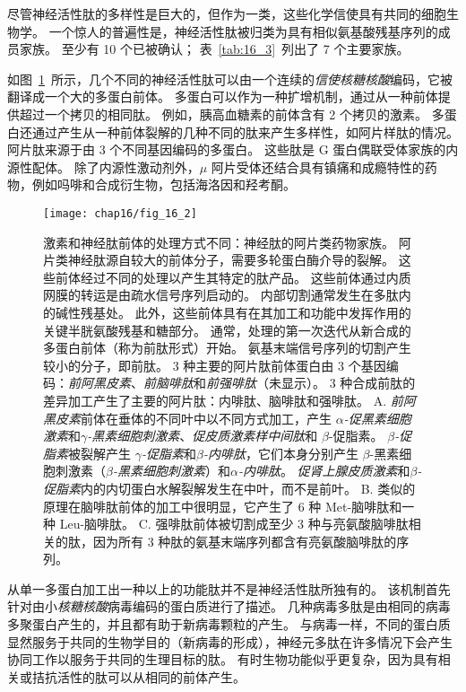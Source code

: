 尽管神经活性肽的多样性是巨大的，但作为一类，这些化学信使具有共同的细胞生物学。
一个惊人的普遍性是，神经活性肽被归类为具有相似氨基酸残基序列的成员家族。
至少有 10 个已被确认；
表~\ref{tab:16_3}~列出了 7 个主要家族。


如图~\ref{fig:16_2}~所示，几个不同的神经活性肽可以由一个连续的\textit{信使核糖核酸}编码，它被翻译成一个大的多蛋白前体。
多蛋白可以作为一种扩增机制，通过从一种前体提供超过一个拷贝的相同肽。
例如，胰高血糖素的前体含有 2 个拷贝的激素。
多蛋白还通过产生从一种前体裂解的几种不同的肽来产生多样性，如阿片样肽的情况。
阿片肽来源于由 3 个不同基因编码的多蛋白。
这些肽是 G 蛋白偶联受体家族的内源性配体。
除了内源性激动剂外，$\mu$ 阿片受体还结合具有镇痛和成瘾特性的药物，例如吗啡和合成衍生物，包括海洛因和羟考酮。


\begin{figure}[htbp]
	\centering
	\texttt{[image: chap16/fig\_16\_2]}
	\caption{激素和神经肽前体的处理方式不同：神经肽的阿片类药物家族。
		阿片类神经肽源自较大的前体分子，需要多轮蛋白酶介导的裂解。
		这些前体经过不同的处理以产生其特定的肽产品。
		这些前体通过内质网膜的转运是由疏水信号序列启动的。
		内部切割通常发生在多肽内的碱性残基处。
		此外，这些前体具有在其加工和功能中发挥作用的关键半胱氨酸残基和糖部分。
		通常，处理的第一次迭代从新合成的多蛋白前体（称为前肽形式）开始。
		氨基末端信号序列的切割产生较小的分子，即前肽。
		3 种主要的阿片肽前体蛋白由 3 个基因编码：\textit{前阿黑皮素}、\textit{前脑啡肽}和\textit{前强啡肽}（未显示）。
		3 种合成前肽的差异加工产生了主要的阿片肽：内啡肽、脑啡肽和强啡肽。
		A. \textit{前阿黑皮素}前体在垂体的不同叶中以不同方式加工，产生 \textit{$\alpha$-促黑素细胞激素}和\textit{$\gamma$-黑素细胞刺激素}、\textit{促皮质激素样中间肽}和 $\beta$-促脂素。 
		\textit{$\beta$-促脂素}被裂解产生 \textit{$\gamma$-促脂素}和\textit{$\beta$-内啡肽}，它们本身分别产生 $\beta$-黑素细胞刺激素（\textit{$\beta$-黑素细胞刺激素}）和\textit{$\alpha$-内啡肽}。
		\textit{促肾上腺皮质激素}和\textit{$\beta$-促脂素}内的内切蛋白水解裂解发生在中叶，而不是前叶。
		B. 类似的原理在脑啡肽前体的加工中很明显，它产生了 6 种 Met-脑啡肽和一种 Leu-脑啡肽。
		C. 强啡肽前体被切割成至少 3 种与亮氨酸脑啡肽相关的肽，因为所有 3 种肽的氨基末端序列都含有亮氨酸脑啡肽的序列。}
	\label{fig:16_2}
\end{figure}


从单一多蛋白加工出一种以上的功能肽并不是神经活性肽所独有的。
该机制首先针对由小\textit{核糖核酸}病毒编码的蛋白质进行了描述。
几种病毒多肽是由相同的病毒多聚蛋白产生的，并且都有助于新病毒颗粒的产生。
与病毒一样，不同的蛋白质显然服务于共同的生物学目的（新病毒的形成），神经元多肽在许多情况下会产生协同工作以服务于共同的生理目标的肽。
有时生物功能似乎更复杂，因为具有相关或拮抗活性的肽可以从相同的前体产生。


